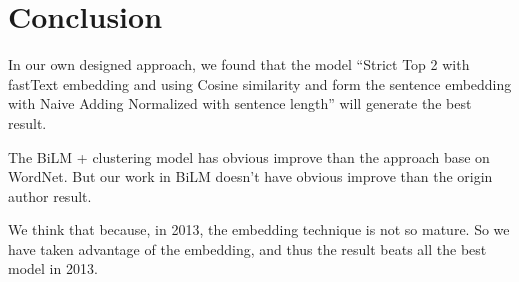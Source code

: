 \section{Conclusion}
\label{sec:conclusion}

In our own designed approach, we found that the model “Strict Top 2 with fastText embedding and using Cosine similarity and form the sentence embedding with Naive Adding Normalized with sentence length” will generate the best result.

The BiLM + clustering model has obvious improve than the approach base on WordNet.
But our work in BiLM doesn't have obvious improve than the origin author result.

We think that because, in 2013, the embedding technique is not so mature. So we have taken advantage of the embedding, and thus the result beats all the best model in 2013.
